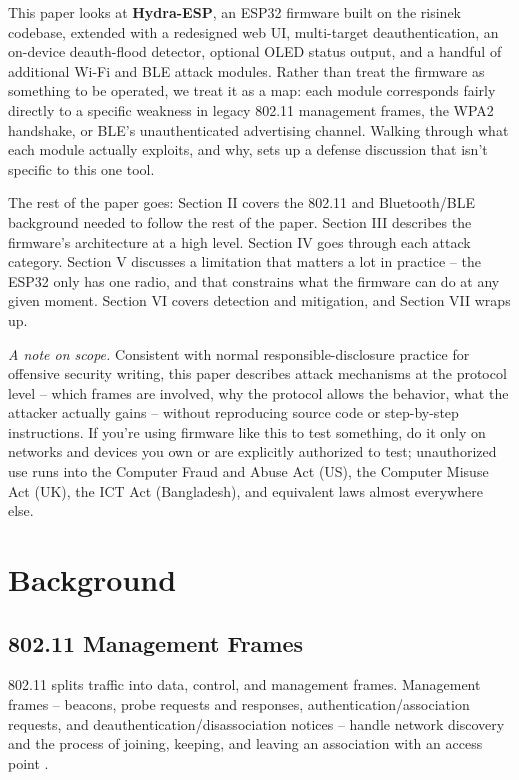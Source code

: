 \documentclass[conference]{IEEEtran}
\begin{document}
This paper looks at \textbf{Hydra-ESP}, an ESP32 firmware built on the risinek codebase, extended with a redesigned web UI, multi-target deauthentication, an on-device deauth-flood detector, optional OLED status output, and a handful of additional Wi-Fi and BLE attack modules. Rather than treat the firmware as something to be operated, we treat it as a map: each module corresponds fairly directly to a specific weakness in legacy 802.11 management frames, the WPA2 handshake, or BLE's unauthenticated advertising channel. Walking through what each module actually exploits, and why, sets up a defense discussion that isn't specific to this one tool.

The rest of the paper goes: Section II covers the 802.11 and Bluetooth/BLE background needed to follow the rest of the paper. Section III describes the firmware's architecture at a high level. Section IV goes through each attack category. Section V discusses a limitation that matters a lot in practice -- the ESP32 only has one radio, and that constrains what the firmware can do at any given moment. Section VI covers detection and mitigation, and Section VII wraps up.

\emph{A note on scope.} Consistent with normal responsible-disclosure practice for offensive security writing, this paper describes attack mechanisms at the protocol level -- which frames are involved, why the protocol allows the behavior, what the attacker actually gains -- without reproducing source code or step-by-step instructions. If you're using firmware like this to test something, do it only on networks and devices you own or are explicitly authorized to test; unauthorized use runs into the Computer Fraud and Abuse Act (US), the Computer Misuse Act (UK), the ICT Act (Bangladesh), and equivalent laws almost everywhere else.

\section{Background}

\subsection{802.11 Management Frames}

802.11 splits traffic into data, control, and management frames. Management frames -- beacons, probe requests and responses, authentication/association requests, and deauthentication/disassociation notices -- handle network discovery and the process of joining, keeping, and leaving an association with an access point \cite{ieee80211}.
\end{document}
